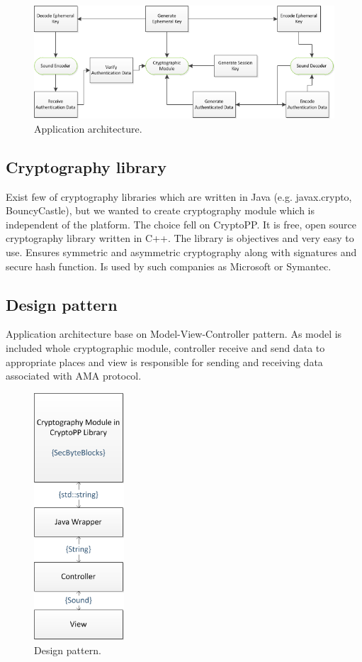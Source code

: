 \documentclass[11pt,titlepage]{article}
\theoremstyle{plain}
\begin{document}
\vspace{5mm}

\begin{figure}[H]
	\centering
	\includegraphics[width=1\textwidth]{img/architecture}
	\caption{Application architecture.}
\end{figure}

\subsection{Cryptography library}

Exist few of cryptography libraries which are written in Java (e.g. javax.crypto, BouncyCastle), but we wanted to create cryptography module which is independent of the platform. The choice fell on CryptoPP. It is free, open source cryptography library written in C++. The library is objectives and very easy to use. Ensures symmetric and asymmetric cryptography along with signatures and secure hash function. Is used by such companies as Microsoft or Symantec.

\subsection{Design pattern}

Application architecture base on Model-View-Controller pattern. As model is included whole cryptographic module, controller receive and send data to appropriate places and view is responsible for sending and receiving data associated with AMA protocol. 

\begin{figure}[H]
	\centering
	\includegraphics[width=0.3\textwidth]{img/Design}
	\caption{Design pattern.}
\end{figure}
\end{document}
